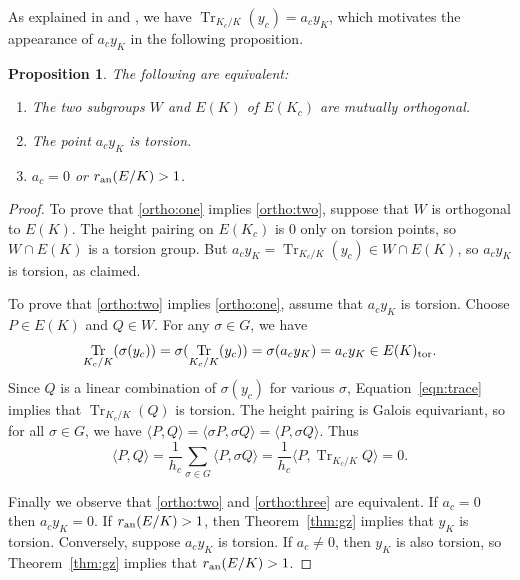 \documentclass[preprint,12pt]{elsarticle}
\newcommand{\Q}{\mathbb{Q}}
\newcommand{\tor}{{\rm tor}}
\newcommand{\an}{{\rm an}}
\DeclareMathOperator{\Tr}{Tr}
\theoremstyle{plain}
\newtheorem{proposition}[theorem]{Proposition}
\theoremstyle{definition}
\begin{document}
As explained in \cite[\S6]{gross:heegnerX0N} and
\cite[Prop.~3.7]{gross:kolyvagin}, we have $\Tr_{K_c/K}(y_c) = a_c y_K$, 
which motivates the appearance of $a_c y_K$ in the following proposition.
\begin{proposition}\label{prop:ortho}
The following are equivalent:
\begin{enumerate}
\item\label{ortho:one}  The two subgroups $W$ and $E(K)$ of $E(K_c)$ are
mutually orthogonal.
\item\label{ortho:two} The point $a_c y_K$ is torsion.
\item\label{ortho:three} $a_c=0$ or $r_{\an}(E/K)> 1$.
\end{enumerate}
\end{proposition}
\begin{proof}
  To prove that \ref{ortho:one} implies \ref{ortho:two}, suppose that
  $W$ is orthogonal to $E(K)$.  The height pairing on $E(K_c)$ is $0$
  only on torsion points, so $W \cap E(K)$ is a torsion group.  But
  $a_c y_K = \Tr_{K_c/K}(y_c) \in W \cap E(K)$, so $a_c y_K$ is
  torsion, as claimed.

To prove that \ref{ortho:two} implies \ref{ortho:one}, assume that
$a_c y_K$ is torsion.  Choose $P \in E(K)$ and $Q \in W$.  For any
$\sigma \in G$, we have 
\begin{equation}\label{eqn:trace}
\Tr_{K_c/K} (\sigma (y_c)) =
\sigma(\Tr_{K_c/K}(y_c)) = \sigma(a_c y_K) = a_c y_K \in E(K)_{\tor}.
\end{equation}
Since $Q$ is a linear combination of
$\sigma(y_c)$ for various $\sigma$, Equation~\eqref{eqn:trace}
implies that $\Tr_{K_c/K}(Q)$ is torsion.
The height pairing is Galois equivariant, so for all
$\sigma \in G$, we have $\langle P, Q \rangle = \langle \sigma P,
\sigma Q \rangle = \langle P, \sigma Q \rangle $. Thus
  $$
    \langle P, Q \rangle = \frac{1}{h_c} \sum_{\sigma \in G} \langle P,
    \sigma Q \rangle = \frac{1}{h_c}\langle P , \Tr_{K_c/K} Q \rangle = 0.
  $$


  Finally we observe that \ref{ortho:two} and \ref{ortho:three} are
  equivalent.  If $a_c=0$ then $a_c y_K=0$.  If $r_{\an}(E/K)>1$, then
  Theorem~\ref{thm:gz} implies that $y_K$ is torsion.  Conversely,
  suppose $a_c y_K$ is torsion.  If $a_c\neq 0$, then $y_K$ is also
  torsion, so Theorem~\ref{thm:gz} implies that $r_{\an}(E/K)>1$.
\end{proof}

\end{document}
